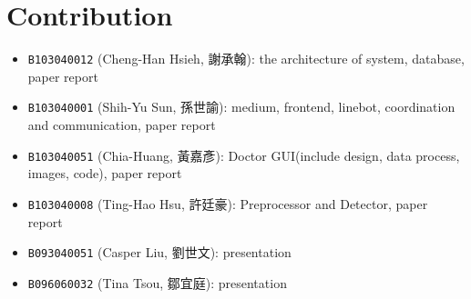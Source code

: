 \documentclass{article}
\begin{document}
\section{Contribution}
\label{sec:contribution}

\begin{itemize}
  \item \texttt{B103040012} (Cheng-Han Hsieh, 謝承翰): the architecture of system, database, paper report
  \item \texttt{B103040001} (Shih-Yu Sun, 孫世諭): medium, frontend, linebot, coordination and communication, paper report
  \item \texttt{B103040051} (Chia-Huang, 黃嘉彥): Doctor GUI(include design, data process, images, code), paper report
  \item \texttt{B103040008} (Ting-Hao Hsu, 許廷豪): Preprocessor and Detector, paper report
  \item \texttt{B093040051} (Casper Liu, 劉世文): presentation
  \item \texttt{B096060032} (Tina Tsou, 鄒宜庭): presentation
\end{itemize}
\end{document}
